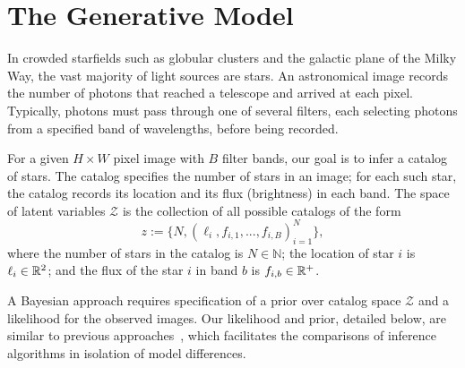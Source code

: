 \section{The Generative Model}
\label{sec:gen_model}

In crowded starfields such as globular clusters and the galactic plane of the Milky Way, the vast majority of light sources are stars.
An astronomical image records the number of photons that reached a telescope and arrived at each pixel.
Typically, photons must pass through one of several filters, each selecting photons from a specified band of wavelengths, before being recorded.

For a given $H \times W$ pixel image with $B$ filter bands, our goal is to infer a catalog of
stars.
The catalog specifies the number of stars
in an image; for each such star, the catalog
records its location and its flux (brightness)
in each band.
The space of latent variables
$\mathcal{Z}$ is the collection of all possible catalogs of the form
\[z := \{N, (\ell_i, f_{i,1}, ..., f_{i,B})_{i = 1}^N\},\]
where the number of stars in the catalog
is $N\in\mathbb{N}$;
the location of star $i$ is $\ell_i \in \mathbb{R}^2$; and
the flux of the star $i$ in band $b$ is $f_{i, b}\in\mathbb{R}^+$.

A Bayesian approach requires specification of a prior over catalog space $\mathcal{Z}$ and a likelihood for the observed images. Our likelihood and prior, detailed below, are similar to previous approaches~\citep{Brewer_2013, Portillo_2017, Feder_2019}, 
which facilitates the comparisons of inference algorithms in isolation of model differences. 

